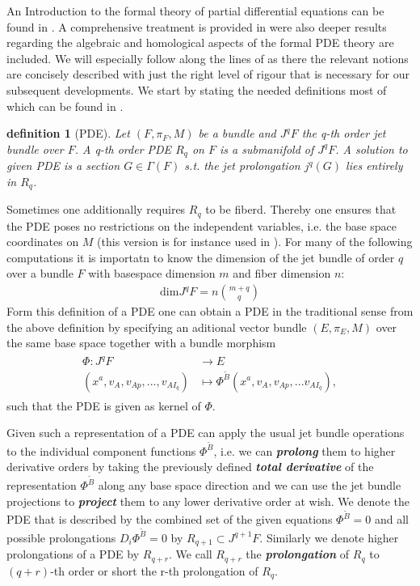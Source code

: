 \documentclass[a4paper,12pt, DIV=14, BCOR=5mm, twoside, headsepline, numbers=noenddot]{scrbook}
\newtheorem{definition}{definition}[section]
\begin{document}
An Introduction to the formal theory of partial differential equations can be found in \cite{saunders_1989}. A comprehensive treatment is provided in \cite{seiler2009involution} were also deeper results regarding the algebraic and homological aspects of the formal PDE theory are included. We will especially follow along the lines of \cite{seiler1994analysis} as there the relevant notions are concisely described with just the right level of rigour that is necessary for our subsequent developments. We start by stating the needed definitions most of which can be found in \cite{seiler1994analysis}.
\begin{definition}[PDE]
Let $(F,\pi_F,M)$ be a bundle and $J^qF$ the q-th order jet bundle over $F$. A q-th order PDE $R_q$ on $F$ is a  submanifold of $J^qF$. A solution to given PDE is a section $G \in \Gamma(F)$ s.t. the jet prolongation $j^q(G)$ lies entirely in $R_q$.  
\end{definition}
Sometimes one additionally requires $R_q$ to be fiberd. Thereby one ensures that the PDE poses no restrictions on the independent variables, i.e. the base space coordinates on $M$ (this version is for instance used in \cite{seiler1994analysis}).
For many of the following computations it is importatn to know the dimension of the jet bundle of order $q$ over a bundle $F$ with basespace dimension $m$ and fiber dimension $n$:
\begin{align}
    \mathrm{dim}J^qF = n\binom{m+q}{q}
\end{align}
Form this definition of a PDE one can obtain a PDE in the traditional sense from the above definition by specifying an aditional vector bundle $(E,\pi_E,M)$ over the same base space together with a bundle morphism
\begin{align}
    \begin{aligned}
    \Phi : J^qF &\longrightarrow E\\
    (x^a, v_A, v_{Ap},...,v_{AI_q}) &\longmapsto \Phi^{\tilde{B}}(x^a, v_A, v_{Ap},...v_{AI_q}),
    \end{aligned}
\end{align}
such that the PDE is given as kernel of $\Phi$. 

Given such a representation of a PDE can apply the usual jet bundle operations to the individual component functions $\Phi^{\tilde{B}}$, i.e. we can \textit{\textbf{prolong}} them to higher derivative orders by taking the previously defined \textit{\textbf{total derivative}} of the representation $\Phi^{\tilde{B}}$ along any base space direction and we can use the jet bundle projections to \textit{\textbf{project}} them to any lower derivative order at wish. We denote the PDE that is described by the combined set of the given equations $\Phi^{\tilde{B}}=0$ and all possible prolongations $D_i\Phi^{\tilde{B}}=0$ by $R_{q+1} \subset J^{q+1}F$. Similarly we denote higher prolongations of a PDE by $R_{q+r}$. We call $R_{q+r}$ the \textit{\textbf{prolongation}} of $R_q$ to $(q+r)$-th order or short the r-th prolongation of $R_q$. 
\end{document}
